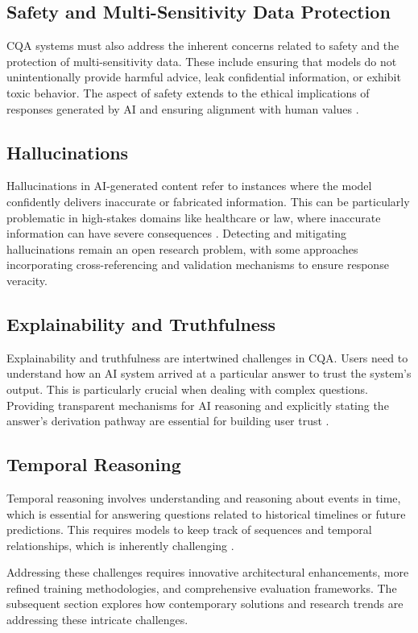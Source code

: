 \documentclass[12pt]{article}
\begin{document}
\subsection{Safety and Multi-Sensitivity Data Protection}
CQA systems must also address the inherent concerns related to safety and the protection of multi-sensitivity data. These include ensuring that models do not unintentionally provide harmful advice, leak confidential information, or exhibit toxic behavior. The aspect of safety extends to the ethical implications of responses generated by AI and ensuring alignment with human values \cite{journalarora}.

\subsection{Hallucinations}
Hallucinations in AI-generated content refer to instances where the model confidently delivers inaccurate or fabricated information. This can be particularly problematic in high-stakes domains like healthcare or law, where inaccurate information can have severe consequences \cite{journaldou}. Detecting and mitigating hallucinations remain an open research problem, with some approaches incorporating cross-referencing and validation mechanisms to ensure response veracity.

\subsection{Explainability and Truthfulness}
Explainability and truthfulness are intertwined challenges in CQA. Users need to understand how an AI system arrived at a particular answer to trust the system’s output. This is particularly crucial when dealing with complex questions. Providing transparent mechanisms for AI reasoning and explicitly stating the answer's derivation pathway are essential for building user trust \cite{journelethayaraj}. 

\subsection{Temporal Reasoning}
Temporal reasoning involves understanding and reasoning about events in time, which is essential for answering questions related to historical timelines or future predictions. This requires models to keep track of sequences and temporal relationships, which is inherently challenging \cite{journallapata}.

Addressing these challenges requires innovative architectural enhancements, more refined training methodologies, and comprehensive evaluation frameworks. The subsequent section explores how contemporary solutions and research trends are addressing these intricate challenges.
\end{document}
